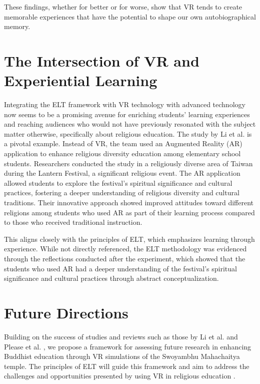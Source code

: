 \documentclass[conference]{IEEEtran}
\begin{document}
These findings, whether for better or for worse, show that VR tends to create memorable experiences that have the potential to shape our own autobiographical memory.

\section{The Intersection of VR and Experiential Learning}

Integrating the ELT framework with VR technology with advanced technology now seems to be a promising avenue for enriching students' learning experiences and reaching audiences who would not have previously resonated with the subject matter otherwise, specifically about religious education. The study by Li et al. \cite{li_religious_2023} is a pivotal example. Instead of VR, the team used an Augmented Reality (AR) application to enhance religious diversity education among elementary school students. Researchers conducted the study in a religiously diverse area of Taiwan during the Lantern Festival, a significant religious event. The AR application allowed students to explore the festival's spiritual significance and cultural practices, fostering a deeper understanding of religious diversity and cultural traditions. Their innovative approach showed improved attitudes toward different religions among students who used AR as part of their learning process compared to those who received traditional instruction.

This aligns closely with the principles of ELT, which emphasizes learning through experience. While not directly referenced, the ELT methodology was evidenced through the reflections conducted after the experiment, which showed that the students who used AR had a deeper understanding of the festival's spiritual significance and cultural practices through abstract conceptualization.

\section{Future Directions}

Building on the success of studies and reviews such as those by Li et al. \cite{li_religious_2023} and Please et al. \cite{please_virtual_2024}, we propose a framework for assessing future research in enhancing Buddhist education through VR simulations of the Swoyambhu Mahachaitya temple. The principles of ELT will guide this framework and aim to address the challenges and opportunities presented by using VR in religious education \cite{zhao_survey_2009}.
\end{document}
